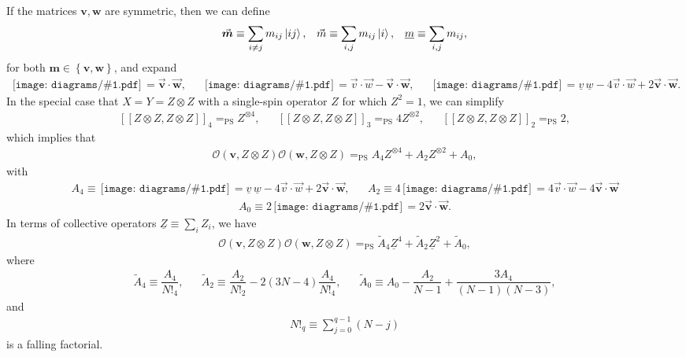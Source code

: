 \documentclass[nofootinbib,notitlepage,11pt]{revtex4-2}
\newcommand{\f}[2]{\dfrac{#1}{#2}} %
\newcommand{\p}[1]{\left(#1\right)} %
\renewcommand{\sp}[1]{\left[#1\right]} %
\newcommand{\spp}[1]{\sp{\sp{#1}}} %
\renewcommand{\set}[1]{\left\{#1\right\}} %
\renewcommand{\c}{\cdot} %
\newcommand{\m}{\bm} %
\renewcommand{\v}{\vec} %
\newcommand{\1}{\mathds{1}}
\renewcommand{\O}{\mathcal{O}}
\newcommand{\EQPS}{=_{\text{PS}}}
\newcommand{\col}{\underline}
\newcommand{\diagram}[1]
{\,\texttt{[image: diagrams/\#1.pdf]}\,}
\begin{document}
If the matrices $\m v,\m w$ are symmetric, then we can define
\begin{align}
  \v{\m m} \equiv \sum_{i\ne j} m_{ij} \ket{ij},
  &&
  \v m \equiv \sum_{i,j} m_{ij} \ket{i},
  &&
  \col{m} \equiv \sum_{i,j} m_{ij},
\end{align}
for both $\m m\in\set{\m v,\m w}$, and expand
\begin{align}
  \diagram{prod_b22_c2} = \v{\m v} \c\v{\m w},
  &&
  \diagram{prod_b22_c1} =
  \v v \c \v w - \v{\m v} \c \v{\m w},
  &&
  \diagram{prod_b22_c0}
  = \col{v}\,\col{w} - 4 \v v\c\v w + 2 \v{\m v}\c\v{\m w}.
\end{align}
In the special case that $X=Y=Z\otimes Z$ with a single-spin operator $Z$ for which $Z^2=1$, we can simplify
\begin{align}
  \spp{Z\otimes Z,Z\otimes Z}_4 \EQPS Z^{\otimes 4},
  &&
  \spp{Z\otimes Z,Z\otimes Z}_3 \EQPS 4 Z^{\otimes 2},
  &&
  \spp{Z\otimes Z,Z\otimes Z}_2 \EQPS 2,
\end{align}
which implies that
\begin{align}
  \O\p{\m v,Z\otimes Z} \O\p{\m w,Z\otimes Z}
  \EQPS A_4 Z^{\otimes 4} + A_2 Z^{\otimes 2} + A_0,
\end{align}
with
\begin{align}
  A_4 \equiv \diagram{prod_b22_c0}
  = \col{v}\,\col{w} - 4 \v v\c\v w + 2 \v{\m v}\c\v{\m w},
  &&
  A_2 \equiv 4 \diagram{prod_b22_c1}
  = 4 \v v \c \v w - 4 \v{\m v} \c \v{\m w}
\end{align}
\begin{align}
  A_0 \equiv 2 \diagram{prod_b22_c2} = 2 \v{\m v} \c\v{\m w}.
\end{align}
In terms of collective operators $\col{Z}\equiv\sum_iZ_i$, we have
\begin{align}
  \O\p{\m v,Z\otimes Z} \O\p{\m w,Z\otimes Z}
  \EQPS \tilde A_4 \col{Z}^4 + \tilde A_2 \col{Z}^2 + \tilde A_0,
\end{align}
where
\begin{align}
  \tilde A_4 \equiv \f{A_4}{N!_4},
  &&
  \tilde A_2 \equiv \f{A_2}{N!_2} - 2\p{3N-4} \f{A_4}{N!_4},
  &&
  \tilde A_0 \equiv A_0 - \f{A_2}{N-1} + \f{3A_4}{\p{N-1}\p{N-3}},
\end{align}
and
\begin{align}
  N!_q \equiv \sum_{j=0}^{q-1} \p{N-j}
\end{align}
is a falling factorial.

\end{document}
